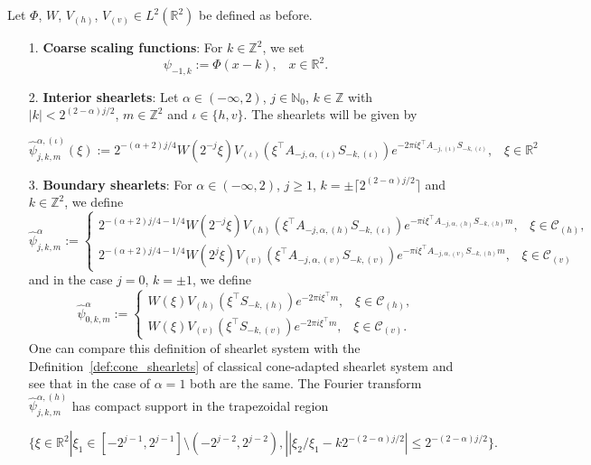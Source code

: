 \bigskip

\begin{defn}
\label{def:alpha31}
Let $\Phi$, $W$, $V_{(h)}$, $V_{(v)}\in L^2(\mathbb{R}^2)$ be defined as before.
\begin{enumerate}
\item[1.] \textbf{Coarse scaling functions}: For $k\in\mathbb{Z}^2$, we set 
$$
\psi_{-1,k}:=\Phi(x-k)\textrm{,}\quad x\in\mathbb{R}^2.
$$
\item[2.] \textbf{Interior shearlets}: Let $\alpha\in (-\infty,2)$, $j\in\mathbb{N}_0$, $k\in\mathbb{Z}$ with $|k|< 2^{(2-\alpha)j/2}$, $m\in\mathbb{Z}^2$ and $\iota\in\{h,v\}$. The shearlets will be given by 

\begin{equation}
\label{eq:alpha35}
\hat{\psi}^{\alpha,(\iota)}_{j,k,m}(\xi):=2^{-(\alpha+2)j/4}W(2^{-j}\xi)V_{(\iota)}(\xi^{\top} A_{-j,\alpha,(\iota)}S_{-k,(\iota)})e^{-2\pi i\xi^{\top}A_{-j,(\iota)}S_{-k,(\iota)}}\textrm{,}\quad \xi\in\mathbb{R}^2
\end{equation}

\item[3.] \textbf{Boundary shearlets}: For $\alpha\in(-\infty,2)$, $j\geq 1$, $k=\pm\lceil 2^{(2-\alpha)j/2}\rceil$ and $k\in\mathbb{Z}^2$, we define
\begin{equation}
\label{eq:alpha36}
\hat{\psi}_{j,k,m}^{\alpha}:=
\begin{cases}
2^{-(\alpha+2)j/4-1/4}W(2^{-j}\xi)V_{(h)}(\xi^{\top} A_{-j,\alpha,(h)}S_{-k,(\iota)})e^{-\pi i\xi^{\top}A_{-j,\alpha,(h)}S_{-k,(h)}m}\textrm{,}\quad \xi\in\mathcal{C}_{(h)},\\
2^{-(\alpha+2)j/4-1/4}W(2^{j}\xi)V_{(v)}(\xi^{\top}A_{-j,\alpha,(v)}S_{-k,(v)})e^{-\pi i\xi^{\top}A_{-j,\alpha,(v)}S_{-k,(h)}m}\textrm{,}\quad \xi\in\mathcal{C}_{(v)}
\end{cases}
\end{equation}
and in the case $j=0$, $k=\pm 1$, we define
$$
\hat{\psi}^{\alpha}_{0,k,m}:=
\begin{cases}
W(\xi) V_{(h)}(\xi^{\top}S_{-k,(h)})e^{-2\pi i\xi^{\top}m}\textrm{,}\quad \xi\in\mathcal{C}_{(h)}\textrm{,}\\
W(\xi)V_{(v)}(\xi^{\top}S_{-k,(v)})e^{-2\pi i\xi^{\top}m}\textrm{,}\quad \xi\in\mathcal{C}_{(v)}.
\end{cases}
$$
One can compare this definition of shearlet system with the Definition~\ref{def:cone_shearlets} of classical cone-adapted shearlet system and see that in the case of $\alpha = 1$ both are the same. The Fourier transform $\hat{\psi}_{j,k,m}^{\alpha,(h)}$ has compact support in the trapezoidal region

\begin{equation}
\label{eq:alpha37}
\{\xi\in\mathbb{R}^2|\xi_1\in[-2^{j-1},2^{j-1}]\setminus (-2^{j-2},2^{j-2}),||\xi_2/\xi_1-k2^{-(2-\alpha)j/2}|\leq 2^{-(2-\alpha)j/2}\}.
\end{equation}
\end{enumerate}
\end{defn}


